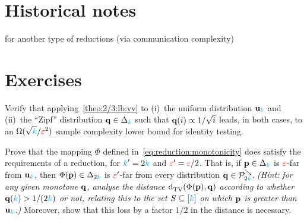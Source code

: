 \section{Historical notes}
\tbc
\citet{BlaisCG17} for another type of reductions (via communication complexity)

\section{Exercises}
\begin{question}\label{ex:2/3:lb:applications}
Verify that applying~\cref{theo:2/3:lb:vv} to (i)~the uniform distribution $\mathbf{u}_{\textcolor{cyan}{k}}$ and (ii)~the ``Zipf'' distribution $\mathbf{q}\in\Delta_{{\textcolor{cyan}{k}}}$ such that $\mathbf{q}(i) \propto 1/\sqrt{i}$ leads, in both cases, to an $\Omega(\sqrt{{\textcolor{cyan}{k}}}/\textcolor{red}{\varepsilon}^2)$ sample complexity lower bound for identity testing.
\end{question}
\begin{question}[$\star$]\label{ex:reduction:monotone}
  Prove that the mapping $\Phi$ defined in~\cref{eq:reduction:monotonicity} does satisfy the requirements of a reduction, for ${\textcolor{cyan}{k}}'=2{\textcolor{cyan}{k}}$ and $\textcolor{red}{\varepsilon}'=\textcolor{red}{\varepsilon}/2$. That is, if $\mathbf{p}\in\Delta_{{\textcolor{cyan}{k}}}$ is $\textcolor{red}{\varepsilon}$-far from $\mathbf{u}_{\textcolor{cyan}{k}}$, then $\Phi(\mathbf{p})\in\Delta_{2{\textcolor{cyan}{k}}}$ is $\textcolor{red}{\varepsilon}'$-far from every distribution $\mathbf{q}\in\mathcal{P}^{\searrow}_{2{\textcolor{cyan}{k}}}$. \textit{(Hint: for any given monotone $\mathbf{q}$, analyse the distance $\totalvardist{\Phi(\p)}{\q}$ according to whether $\mathbf{q}({\textcolor{cyan}{k}}) > 1/(2{\textcolor{cyan}{k}})$ or not, relating this to the set $S\subseteq[{\textcolor{cyan}{k}}]$ on which $\mathbf{p}$ is greater than $\mathbf{u}_{\textcolor{cyan}{k}}$.)} Moreover, show that this loss by a factor $1/2$ in the distance is necessary.
\end{question}
\iffalse %
